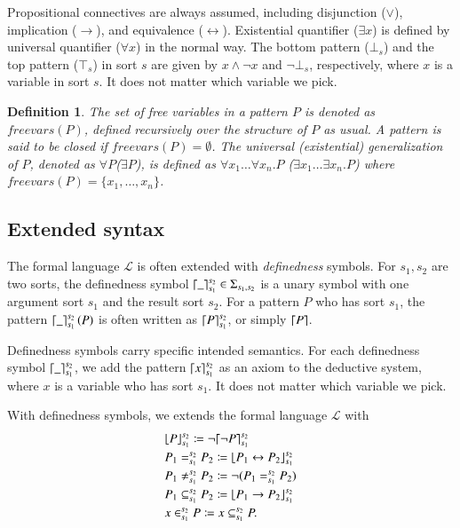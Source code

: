 \documentclass{article}
\theoremstyle{plain}
\newtheorem{defn}[thm]{Definition}
\DeclarePairedDelimiter\ceil{\lceil}{\rceil}
\DeclarePairedDelimiter\floor{\lfloor}{\rfloor}
\def\fv{\textit{freevars}}
\begin{document}
Propositional connectives are always assumed, including disjunction ($\vee$), implication ($\to$), and equivalence ($\leftrightarrow$). Existential quantifier ($\exists x$) is defined by universal quantifier ($\forall x$) in the normal way. The bottom pattern ($\bot_s$) and the top pattern ($\top_s$) in sort $s$ are given by $x \wedge \neg x$ and $\neg \bot_s$, respectively, where $x$ is a variable in sort $s$. It does not matter which variable we pick.

\begin{defn}
	The set of free variables in a pattern $P$ is denoted as $\fv(P)$, defined recursively over the structure of $P$ as usual. A pattern is said to be \emph{closed} if $\fv(P) = \emptyset$. The universal (existential) generalization of $P$, denoted as $\forall P$($\exists P$), is defined as $\forall x_1 \dots \forall x_n . P$ ($\exists x_1 \dots \exists x_n . P$) where $\fv(P) = \{x_1,\dots,x_n\}$.
\end{defn}


\subsection{Extended syntax}
The formal language $\mathcal{L}$ is often extended with \emph{definedness} symbols. For $s_1, s_2$ are two sorts, the definedness symbol $\ceil*{\_}_{s_1}^{s_2} \in \Sigma_{s_1,s_2}$ is a unary symbol with one argument sort $s_1$ and the result sort $s_2$. For a pattern $P$ who has sort $s_1$, the pattern $\ceil*{\_}_{s_1}^{s_2} \left(P\right)$ is often written as $\ceil*{P}_{s_1}^{s_2}$, or simply $\ceil*{P}$.

Definedness symbols carry specific intended semantics. For each definedness symbol $\ceil*{\_}_{s_1}^{s_2}$, we add the pattern $\ceil*{x}_{s_1}^{s_2}$ as an axiom to the deductive system, where $x$ is a variable who has sort $s_1$. It does not matter which variable we pick.

With definedness symbols, we extends the formal language $\mathcal{L}$ with 
\begin{align*}
&\floor*{P}_{s_1}^{s_2} \coloneqq {\neg} \ceil*{\neg P}_{s_1}^{s_2} \\
&P_1 =_{s_1}^{s_2} P_2 \coloneqq \floor*{P_1 \leftrightarrow P_2}_{s_1}^{s_2} \\
&P_1 \neq_{s_1}^{s_2} P_2 \coloneqq \neg (P_1 =_{s_1}^{s_2} P_2) \\
&P_1 \subseteq_{s_1}^{s_2} P_2 \coloneqq \floor*{P_1 \to P_2}_{s_1}^{s_2} \\
&x \in_{s_1}^{s_2} P \coloneqq x \subseteq_{s_1}^{s_2} P.
\end{align*}
\end{document}
